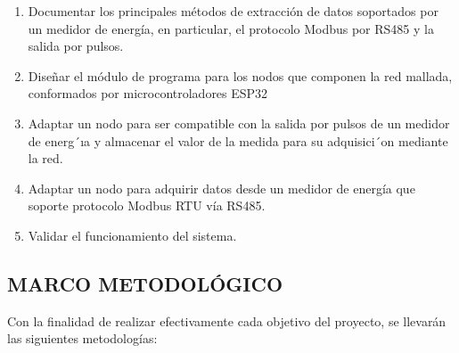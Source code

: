 \documentclass[12pt,letterpaper]{article}
\begin{document}
\begin{enumerate}[1.]
	
	
	 \item Documentar los principales métodos de extracción de datos soportados por un medidor de energía, en particular, el protocolo Modbus por RS485 y la salida por pulsos.
	
	 \item Diseñar el módulo de programa para los nodos que componen la red mallada, conformados por microcontroladores ESP32
	
	 \item Adaptar un nodo para ser compatible con la salida por pulsos de un medidor de energ´ıa y almacenar el valor de la medida para su adquisici´on mediante la red.
	
	 \item Adaptar un nodo para adquirir datos desde un medidor de energía que soporte protocolo Modbus RTU vía RS485.
	
	 \item Validar el funcionamiento del sistema.
 	
 	
 	
 	
 	

\end{enumerate}
\newpage



\begin{center}
	
	\section*{ MARCO METODOLÓGICO}
	
\end{center}

\vspace{1cm}

Con la finalidad de realizar efectivamente cada objetivo del proyecto, se llevarán las siguientes metodologías:
\bigskip
\end{document}
